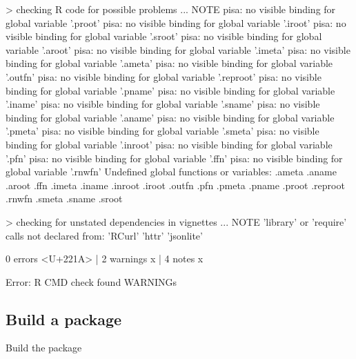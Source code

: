 \documentclass[a4paper,12pt]{article}\usepackage[]{graphicx}\usepackage[]{color}
\begin{document}
\begin{Schunk}
\begin{Soutput}
> checking R code for possible problems ... NOTE
  pisa: no visible binding for global variable '.proot'
  pisa: no visible binding for global variable '.iroot'
  pisa: no visible binding for global variable '.sroot'
  pisa: no visible binding for global variable '.aroot'
  pisa: no visible binding for global variable '.imeta'
  pisa: no visible binding for global variable '.ameta'
  pisa: no visible binding for global variable '.outfn'
  pisa: no visible binding for global variable '.reproot'
  pisa: no visible binding for global variable '.pname'
  pisa: no visible binding for global variable '.iname'
  pisa: no visible binding for global variable '.sname'
  pisa: no visible binding for global variable '.aname'
  pisa: no visible binding for global variable '.pmeta'
  pisa: no visible binding for global variable '.smeta'
  pisa: no visible binding for global variable '.inroot'
  pisa: no visible binding for global variable '.pfn'
  pisa: no visible binding for global variable '.ffn'
  pisa: no visible binding for global variable '.rnwfn'
  Undefined global functions or variables:
    .ameta .aname .aroot .ffn .imeta .iname .inroot .iroot .outfn .pfn
    .pmeta .pname .proot .reproot .rnwfn .smeta .sname .sroot

> checking for unstated dependencies in vignettes ... NOTE
  'library' or 'require' calls not declared from:
    'RCurl' 'httr' 'jsonlite'

0 errors <U+221A> | 2 warnings x | 4 notes x
\end{Soutput}
\begin{Soutput}
Error: R CMD check found WARNINGs
\end{Soutput}
\end{Schunk}
\clearpage
\subsection{Build a package}

Build the package
\end{document}
